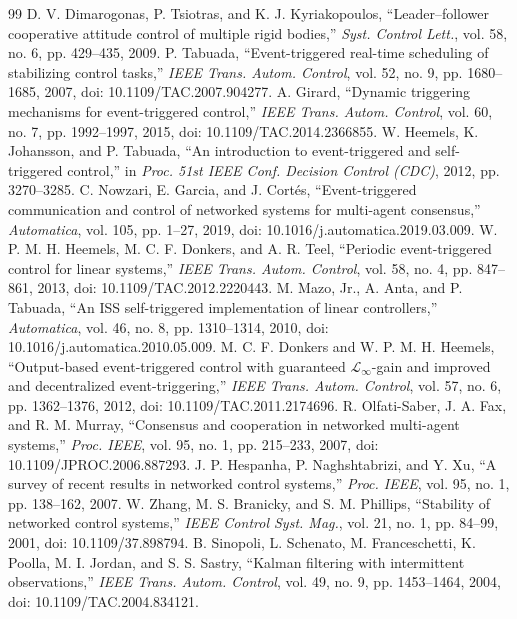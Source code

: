 \begin{thebibliography}{99}
 D. V. Dimarogonas, P. Tsiotras, and K. J. Kyriakopoulos, ``Leader--follower cooperative attitude control of multiple rigid bodies,'' \emph{Syst. Control Lett.}, vol. 58, no. 6, pp. 429--435, 2009.
 P. Tabuada, ``Event-triggered real-time scheduling of stabilizing control tasks,'' \emph{IEEE Trans. Autom. Control}, vol. 52, no. 9, pp. 1680--1685, 2007, doi: 10.1109/TAC.2007.904277.
 A. Girard, ``Dynamic triggering mechanisms for event-triggered control,'' \emph{IEEE Trans. Autom. Control}, vol. 60, no. 7, pp. 1992--1997, 2015, doi: 10.1109/TAC.2014.2366855.
 W. Heemels, K. Johansson, and P. Tabuada, ``An introduction to event-triggered and self-triggered control,'' in \emph{Proc. 51st IEEE Conf. Decision Control (CDC)}, 2012, pp. 3270--3285.
 C. Nowzari, E. Garcia, and J. Cort\'es, ``Event-triggered communication and control of networked systems for multi-agent consensus,'' \emph{Automatica}, vol. 105, pp. 1--27, 2019, doi: 10.1016/j.automatica.2019.03.009.
 W. P. M. H. Heemels, M. C. F. Donkers, and A. R. Teel, ``Periodic event-triggered control for linear systems,'' \emph{IEEE Trans. Autom. Control}, vol. 58, no. 4, pp. 847--861, 2013, doi: 10.1109/TAC.2012.2220443.
 M. Mazo, Jr., A. Anta, and P. Tabuada, ``An ISS self-triggered implementation of linear controllers,'' \emph{Automatica}, vol. 46, no. 8, pp. 1310--1314, 2010, doi: 10.1016/j.automatica.2010.05.009.
 M. C. F. Donkers and W. P. M. H. Heemels, ``Output-based event-triggered control with guaranteed $\mathcal{L}_\infty$-gain and improved and decentralized event-triggering,'' \emph{IEEE Trans. Autom. Control}, vol. 57, no. 6, pp. 1362--1376, 2012, doi: 10.1109/TAC.2011.2174696.
 R. Olfati-Saber, J. A. Fax, and R. M. Murray, ``Consensus and cooperation in networked multi-agent systems,'' \emph{Proc. IEEE}, vol. 95, no. 1, pp. 215--233, 2007, doi: 10.1109/JPROC.2006.887293.
 J. P. Hespanha, P. Naghshtabrizi, and Y. Xu, ``A survey of recent results in networked control systems,'' \emph{Proc. IEEE}, vol. 95, no. 1, pp. 138--162, 2007.
 W. Zhang, M. S. Branicky, and S. M. Phillips, ``Stability of networked control systems,'' \emph{IEEE Control Syst. Mag.}, vol. 21, no. 1, pp. 84--99, 2001, doi: 10.1109/37.898794.
 B. Sinopoli, L. Schenato, M. Franceschetti, K. Poolla, M. I. Jordan, and S. S. Sastry, ``Kalman filtering with intermittent observations,'' \emph{IEEE Trans. Autom. Control}, vol. 49, no. 9, pp. 1453--1464, 2004, doi: 10.1109/TAC.2004.834121.

\end{thebibliography}
